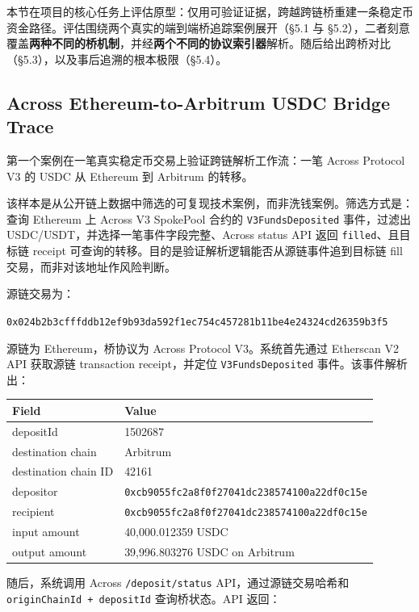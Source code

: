 \documentclass[12pt,a4paper]{ctexart}
\begin{document}
本节在项目的核心任务上评估原型：仅用可验证证据，跨越跨链桥重建一条稳定币资金路径。评估围绕两个真实的端到端桥追踪案例展开（§5.1
与
§5.2），二者刻意覆盖\textbf{两种不同的桥机制}，并经\textbf{两个不同的协议索引器}解析。随后给出跨桥对比（§5.3），以及事后追溯的根本极限（§5.4）。

\hypertarget{across-ethereum-to-arbitrum-usdc-bridge-trace}{%
\subsection{Across Ethereum-to-Arbitrum USDC Bridge
Trace}\label{across-ethereum-to-arbitrum-usdc-bridge-trace}}

第一个案例在一笔真实稳定币交易上验证跨链解析工作流：一笔 Across Protocol
V3 的 USDC 从 Ethereum 到 Arbitrum 的转移。

该样本是从公开链上数据中筛选的可复现技术案例，而非洗钱案例。筛选方式是：查询
Ethereum 上 Across V3 SpokePool 合约的 \texttt{V3FundsDeposited}
事件，过滤出 USDC/USDT，并选择一笔事件字段完整、Across status API 返回
\texttt{filled}、且目标链 receipt
可查询的转移。目的是验证解析逻辑能否从源链事件追到目标链 fill
交易，而非对该地址作风险判断。

源链交易为：

\texttt{0x024b2b3cfffddb12ef9b93da592f1ec754c457281b11be4e24324cd26359b3f5}

源链为 Ethereum，桥协议为 Across Protocol V3。系统首先通过 Etherscan V2
API 获取源链 transaction receipt，并定位 \texttt{V3FundsDeposited}
事件。该事件解析出：

\begin{longtable}[]{@{}ll@{}}
\toprule
Field & Value\tabularnewline
\midrule
\endhead
depositId & 1502687\tabularnewline
destination chain & Arbitrum\tabularnewline
destination chain ID & 42161\tabularnewline
depositor &
\texttt{0xcb9055fc2a8f0f27041dc238574100a22df0c15e}\tabularnewline
recipient &
\texttt{0xcb9055fc2a8f0f27041dc238574100a22df0c15e}\tabularnewline
input amount & 40,000.012359 USDC\tabularnewline
output amount & 39,996.803276 USDC on Arbitrum\tabularnewline
\bottomrule
\end{longtable}

随后，系统调用 Across \texttt{/deposit/status} API，通过源链交易哈希和 \texttt{originChainId\ +\ depositId} 查询桥状态。API
返回：
\end{document}
